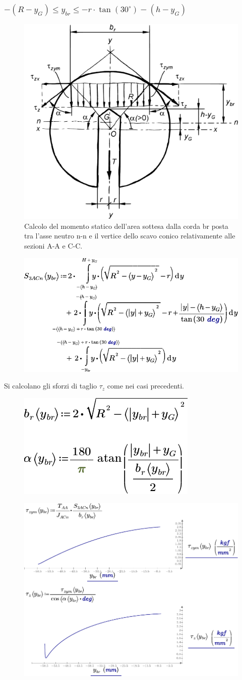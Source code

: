 \subsubsection{$-(R-y_G) \leq y_{br} \leq -r \cdot \tan(30^\circ)-(h-y_G)$}
\begin{figure}[H]
\centering
  \includegraphics[width=.4\textwidth]{imgs/Cap7/SezAsse12}
\caption{Calcolo del momento statico dell’area sottesa dalla corda br posta tra l’asse neutro n-n e il vertice dello scavo conico relativamente alle sezioni A-A e C-C.}
\label{fig:SezAsse12}
\end{figure}
\begin{figure}[H]
\centering
  \includegraphics[width=.6\textwidth]{imgs/MathAsse6_0}
\caption{}
\label{fig:MathAsse6_0}
\end{figure}
Si calcolano gli sforzi di taglio $\tau_z$ come nei casi precedenti. 
\begin{figure}[H]
\centering
  \includegraphics[width=.25\textwidth]{imgs/MathAsse6_1}
\caption{}
\label{fig:MathAsse6_1}
\end{figure}
\begin{figure}[H]
\centering
  \includegraphics[width=.75\textwidth]{imgs/MathAsse6_2}
\caption{}
\label{fig:MathAsse6_2}
\end{figure}
